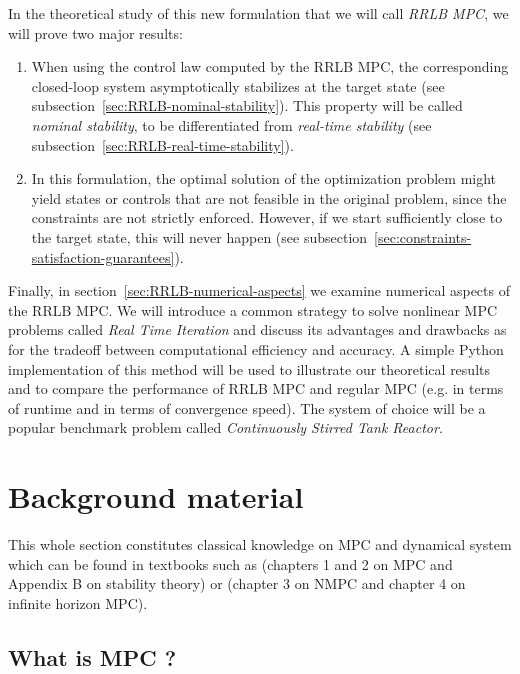 \documentclass[12pt]{article}
\begin{document}
In the theoretical study of this new formulation that we will call \textit{RRLB MPC}, we will prove two major results:

\begin{enumerate}
	\item When using the control law computed by the RRLB MPC, the corresponding closed-loop system asymptotically stabilizes at the target state (see subsection~\ref{sec:RRLB-nominal-stability}).
	This property will be called \textit{nominal stability}, to be differentiated from \textit{real-time stability} (see subsection~\ref{sec:RRLB-real-time-stability}).
	\item In this formulation, the optimal solution of the optimization problem might yield states or controls that are not feasible in the original problem, since the constraints are not strictly enforced.
	However, if we start sufficiently close to the target state, this will never happen (see subsection~\ref{sec:constraints-satisfaction-guarantees}).
\end{enumerate}

Finally, in section~\ref{sec:RRLB-numerical-aspects} we examine numerical aspects of the RRLB MPC.
We will introduce a common strategy to solve nonlinear MPC problems called \textit{Real Time Iteration} and discuss its advantages and drawbacks as for the tradeoff between computational efficiency and accuracy.
A simple Python implementation of this method will be used to illustrate our theoretical results and to compare the performance of RRLB MPC and regular MPC (e.g. in terms of runtime and in terms of convergence speed).
The system of choice will be a popular benchmark problem called \textit{Continuously Stirred Tank Reactor}.

\section{Background material}\label{sec:background-material}

This whole section constitutes classical knowledge on MPC and dynamical system which can be found in textbooks such as \cite{MPC-book} (chapters 1 and 2 on MPC and Appendix B on stability theory) or \cite{MPC-book-2} (chapter 3 on NMPC and chapter 4 on infinite horizon MPC).

\subsection{What is MPC ?}\label{sec:what-is-MPC}
\end{document}
